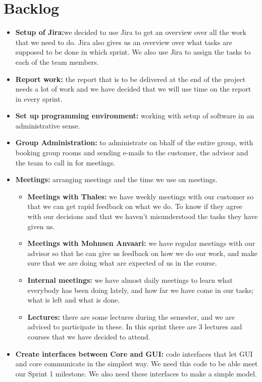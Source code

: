 \section{Backlog}

\begin{itemize}
\item{}\textbf{Setup of Jira:}we decided to use Jira to get an overview over all the work that we need to do. Jira also gives us an overview over what tasks are supposed to be done in which sprint. We also use Jira to assign the tasks to each of the team members.
\item{}\textbf{Report work:} the report that is to be delivered at the end of the project needs a lot of work and we have decided that we will use time on the report in every sprint.
\item{}\textbf{Set up programming environment:} working with setup of software in an administrative sense.
\item{}\textbf{Group Administration:} to administrate on bhalf of the entire group, with booking group rooms and sending e-mails to the customer, the advisor and the team to call in for meetings.
\item{}\textbf{Meetings:} arranging meetings and the time we use on meetings.
\begin{itemize}
\item{}\textbf{Meetings with Thales:} we have weekly meetings with our customer so that we can get rapid feedback on what we do. To know if they agree with our decisions and that we haven’t misunderstood the tasks they have given us.
\item{}\textbf{Meetings with Mohnsen Anvaari:} we have regular meetings with our advisor so that he can give us feedback on how we do our work, and make sure that we are doing what are expected of us in the course.
\item{}\textbf{Internal meetings:} we have almost daily meetings to learn what everybody has been doing lately, and how far we have come in our tasks; what is left and what is done.
\item{}\textbf{Lectures:} there are some lectures during the semester, and we are adviced to participate in these. In this sprint there are 3 lectures and courses that we have decided to attend.
\end{itemize}
\item{}\textbf{Create interfaces between Core and GUI:} code interfaces that let GUI and core communicate in the simplest way. We need this code to be able meet our Sprint 1 milestone. We also need these interfaces to make a simple model.

\end{itemize}
